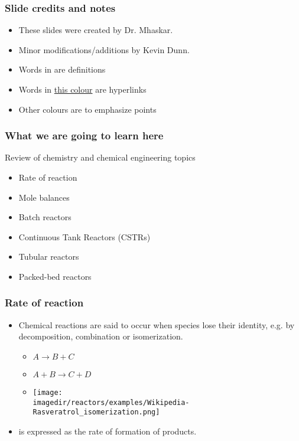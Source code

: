 \begin{frame}\frametitle{Slide credits and notes}
	\begin{itemize}
		\item	These slides were created by Dr. Mhaskar.
		\item	Minor modifications/additions by Kevin Dunn.
	\end{itemize}
	
	\vspace{12pt}
	\begin{itemize}
		\item	Words in {\color{purple}{purple}} are definitions
		\item	Words in \href{http://learnche.mcmaster.ca/3K4}{this colour} are hyperlinks
		\item	Other colours are to emphasize points
	\end{itemize}
\end{frame}

\begin{frame}\frametitle{What we are going to learn here}
	Review of chemistry and chemical engineering topics
	\begin{itemize}
		\item	Rate of reaction
		\item	Mole balances
		\item	Batch reactors
		\item	Continuous Tank Reactors (CSTRs)
		\item	Tubular reactors
		\item	Packed-bed reactors
	\end{itemize}
\end{frame}

\begin{frame}\frametitle{Rate of reaction} 
	\begin{itemize}
		\item	 Chemical reactions are said to occur when species lose their identity, e.g. by decomposition, combination or isomerization.
		\begin{itemize}
			\item	$ A  \longrightarrow B + C $ 
			\item	$ A + B \longrightarrow C + D $ 
			\item	\texttt{[image: \\imagedir/reactors/examples/Wikipedia-Rasveratrol\_isomerization.png]}\qquad{}
		\end{itemize}
		\item	 {\color{purple}{Rate of reaction}} is expressed as the rate of formation of products. 
	\end{itemize}
\end{frame}

